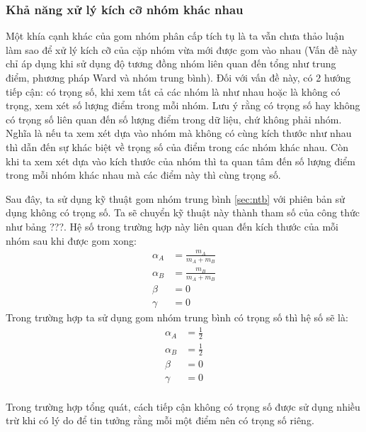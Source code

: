 \subsubsection{Khả năng xử lý kích cỡ nhóm khác nhau}
Một khía cạnh khác của gom nhóm phân cấp tích tụ là ta vẫn chưa thảo luận làm sao để xử lý kích cỡ của cặp nhóm vừa mới được gom vào nhau (Vấn đề này chỉ áp dụng khi sử dụng độ tương đồng nhóm liên quan đến tổng như trung điểm, phương pháp Ward và nhóm trung bình).
Đối với vấn đề này, có 2 hướng tiếp cận: có trọng số, khi xem tất cả các nhóm là như nhau hoặc là không có trọng, xem xét số lượng điểm trong mỗi nhóm.
Lưu ý rằng có trọng số hay không có trọng số liên quan đến số lượng điểm trong dữ liệu, chứ không phải nhóm.
Nghĩa là nếu ta xem xét dựa vào nhóm mà không có cùng kích thước như nhau thì dẫn đến sự khác biệt về trọng số của điểm trong các nhóm khác nhau.
Còn khi ta xem xét dựa vào kích thước của nhóm thì ta quan tâm đến số lượng điểm trong mỗi nhóm khác nhau mà các điểm này thì cùng trọng số.

Sau đây, ta sử dụng kỹ thuật gom nhóm trung bình \ref{sec:ntb} với phiên bản sử dụng không có trọng số.
Ta sẽ chuyển kỹ thuật này thành tham số của công thức như bảng ???.
Hệ số trong trường hợp này liên quan đến kích thước của mỗi nhóm sau khi được gom xong:
\begin{equation}
\begin{aligned}
\alpha_A &= \frac{m_A}{m_A + m_B}	\\
\alpha_B &= \frac{m_B}{m_A + m_B}	\\
\beta &= 0		\\
\gamma &= 0
\end{aligned}
\end{equation}
Trong trường hợp ta sử dụng gom nhóm trung bình có trọng số thì hệ số sẽ là:
\begin{equation}
\begin{aligned}
\alpha_A &= \frac{1}{2} \\
\alpha_B &= \frac{1}{2} \\
\beta &= 0		\\
\gamma &= 0		\\
\end{aligned}
\end{equation}

Trong trường hợp tổng quát, cách tiếp cận không có trọng số được sử dụng nhiều trừ khi có lý do để tin tưởng rằng mỗi một điểm nên có trọng số riêng.

